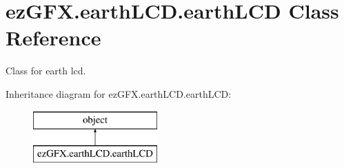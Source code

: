\hypertarget{classez_g_f_x_1_1earth_l_c_d_1_1earth_l_c_d}{}\section{ez\+G\+F\+X.\+earth\+L\+C\+D.\+earth\+L\+CD Class Reference}
\label{classez_g_f_x_1_1earth_l_c_d_1_1earth_l_c_d}


Class for earth lcd.  


Inheritance diagram for ez\+G\+F\+X.\+earth\+L\+C\+D.\+earth\+L\+CD\+:\begin{figure}[H]
\begin{center}
\leavevmode
\includegraphics[height=2.000000cm]{classez_g_f_x_1_1earth_l_c_d_1_1earth_l_c_d}
\end{center}
\end{figure}
